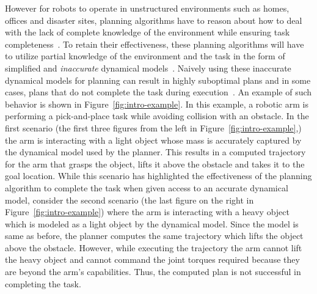However for robots to operate in unstructured environments such as
homes, offices and disaster sites, planning algorithms have to
reason about how to deal with the lack of complete knowledge of the
environment while ensuring task completeness~\cite{DBLP:journals/ai/KaelblingLC98}. To retain their
effectiveness, these planning algorithms will have to utilize partial
knowledge of the environment and the task in the form of simplified
and \textit{inaccurate} dynamical models~\cite{abbeel2006using}.
Naively using these inaccurate dynamical models for planning
can result in highly suboptimal plans and in some cases, plans that do
not complete the task during execution~\cite{kolter2010learning}. An example of such behavior is
shown in Figure~\ref{fig:intro-example}. In this example, a robotic arm is
performing a pick-and-place task while avoiding collision with an
obstacle. In the first scenario (the first three figures from the left
in Figure~\ref{fig:intro-example},) the arm is interacting with a
light object whose mass is accurately captured by the dynamical model
used by the planner. This results in a computed trajectory for the
arm that grasps the object, lifts it above the obstacle and takes it
to the goal location. While this scenario has highlighted the
effectiveness of the planning algorithm to complete the task when
given access to an accurate dynamical model, consider the second
scenario (the last figure on the right in
Figure~\ref{fig:intro-example}) where the arm is interacting with a
heavy object which is modeled as a light object by the dynamical
model. Since the model is same as before, the planner computes the
same trajectory which lifts the object above the obstacle. However,
while executing the trajectory the arm cannot lift the heavy object and
cannot command the joint torques required because they are beyond the
arm's capabilities. Thus, the computed plan is not successful in
completing the task.
